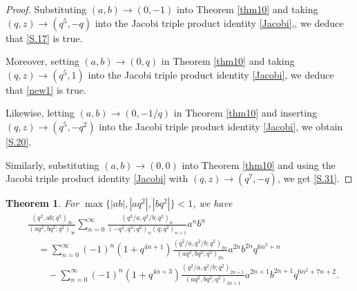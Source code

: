 \documentclass[reqno,12pt]{amsart}
\newtheorem{theorem}{Theorem}[section]%
\theoremstyle{remark}
\numberwithin{equation}{section}
\begin{document}
\begin{proof}
Substituting $\left(a,b\right)\to\left(0,-1\right)$ into Theorem \ref{thm10} and taking $\left(q,z\right)\to\left(q^5, -q\right)$ into the Jacobi triple product identity \eqref{Jacobi},, we deduce that \eqref{S.17} is true.

Moreover, setting $\left(a,b\right)\to\left(0,q\right)$ in Theorem \ref{thm10} and taking $\left(q,z\right)\to\left(q^5,1\right)$ into the Jacobi triple product identity \eqref{Jacobi}, we deduce that \ref{new1} is true.

Likewise, letting $\left(a,b\right)\to\left(0,-1/q\right)$ in Theorem \ref{thm10} and inserting $\left(q,z\right)\to\left(q^5,-q^2\right)$ into the Jacobi triple product identity \eqref{Jacobi}, we obtain \eqref{S.20}.

Similarly, substituting $\left(a,b\right)\to\left(0,0\right)$ into Theorem \ref{thm10} and using the Jacobi triple product identity \eqref{Jacobi} with $\left(q,z\right)\to\left(q^7,-q\right)$, we get \eqref{S.31}.
\end{proof}
%
%
\begin{theorem}\label{thm12}
For $\max\{|ab|,|aq^2|,|bq^2|\}<1$, we have
\begin{align*}
&\frac{\left(q^2,ab;q^2\right)_{\infty}}{\left(aq^2,bq^2;q^2\right)_{\infty}}
\sum_{n=0}^{\infty}
\frac{\left(q^2/a,q^2/b;q^2\right)_n}{\left(-q^2,q^2;q^2\right)_n\left(q;q^2\right)_{n+1}}a^nb^n\\
&\quad=\sum_{n=0}^{\infty}\left(-1\right)^n\left(1+q^{4n+1}\right)
\frac{\left(q^2/a,q^2/b;q^2\right)_{2n}}{\left(aq^2,bq^2;q^2\right)_{2n}}
a^{2n}b^{2n}q^{6n^2+n}\\
&\qquad-
\sum_{n=0}^{\infty}\left(-1\right)^n\left(1+q^{4n+3}\right)
\frac{\left(q^2/a,q^2/b;q^2\right)_{2n+1}}{\left(aq^2,bq^2;q^2\right)_{2n+1}}
a^{2n+1}b^{2n+1}q^{6n^2+7n+2}.
\end{align*}
\end{theorem}
\end{document}
